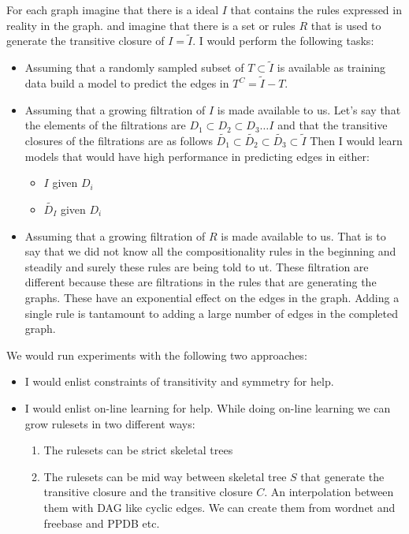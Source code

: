 \documentclass[12pt,answers]{exam} %
\begin{document}
\begin{questions}
{    For each graph imagine that there is a ideal $I$ that contains the
    rules expressed in reality in the graph. and imagine that there is
    a set or rules $R$ that is used to generate the transitive closure
    of $I = \tilde{I}$. I would perform the following tasks:

    \begin{itemize}
    \item Assuming that a randomly sampled subset of $T \subset \tilde{I}$ is available
      as training data build a model to predict the edges in $T^C =
      \tilde{I} - T$.
    \item Assuming that a growing filtration of $I$ is made available
      to us. Let's say that the elements of the filtrations are $D_1
      \subset D_2 \subset D_3\ldots I$ and that the transitive
      closures of the filtrations are as follows
      $\tilde{D_1} \subset \tilde{D_2} \subset \tilde{D_3} \subset
      \tilde{I}$
      Then I would learn models that would have high performance in
      predicting edges in either:
      \begin{itemize}
      \item $I$ given $D_i$
      \item $\tilde{D_I}$ given $D_i$
      \end{itemize}
    \item Assuming that a growing filtration of $R$ is made available
      to us. That is to say that we did not know all the
      compositionality rules in the beginning and steadily and surely
      these rules are being told to ut.
      These filtration are different because these are
      filtrations in the rules that are generating the graphs.
      These have an exponential effect on the edges in the graph.
      Adding a single rule is tantamount to adding a large number of
      edges in the completed graph.
    \end{itemize}

We would run experiments with the following two approaches:
\begin{itemize}
\item I would enlist constraints of transitivity and symmetry for help.
\item I would enlist on-line learning for help. While doing on-line
  learning we can grow rulesets in two different ways:
  \begin{enumerate}
  \item The rulesets can be strict skeletal trees
  \item The rulesets can be mid way between skeletal tree $S$ that generate
    the transitive closure and the transitive closure $C$. An
    interpolation between them with DAG like cyclic edges.
    We can create them from wordnet and freebase and PPDB etc.
  \end{enumerate}
\end{itemize}

}
\end{questions}
\end{document}

